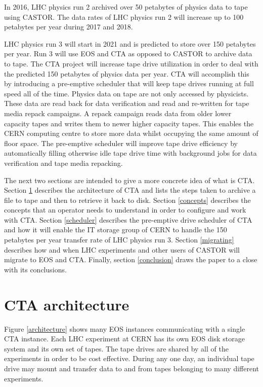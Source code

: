 \documentclass[a4paper]{jpconf}
\begin{document}
In 2016, LHC physics run 2 archived over 50 petabytes of physics data to tape
using CASTOR.  The data rates of LHC physics run 2 will increase up to 100
petabytes per year during 2017 and 2018.

LHC physics run 3 will start in 2021 and is predicted to store over 150
petabytes per year.  Run 3 will use EOS and CTA as opposed to CASTOR to archive
data to tape.  The CTA project will increase tape drive utilization in order to
deal with the predicted 150 petabytes of physics data per year.  CTA
will accomplish this by introducing a pre-emptive scheduler that will keep
tape drives running at full speed \cite{new} all of the time.  Physics data on
tape are not only accessed by physicists.  These data are read back for data
verification and read and re-written for tape media repack\cite{repack}
campaigns. A repack campaign reads data from older lower capacity tapes and
writes them to newer higher capacity tapes.  This enables the CERN computing
centre to store more data whilst occupying the same amount of floor space. The
pre-emptive scheduler will improve tape drive efficiency by automatically
filling otherwise idle tape drive time with background jobs for data
verification and tape media repacking.

The next two sections are intended to give a more concrete idea of what is CTA.
Section \ref{cta_architecture} describes the architecture of CTA and lists the
steps taken to archive a file to tape and then to retrieve it back to disk.
Section \ref{concepts} describes the concepts that an operator needs to
understand in order to configure and work with CTA.  Section \ref{scheduler}
describes the pre-emptive drive scheduler of CTA and how it will enable the IT
storage group of CERN to handle the 150 petabytes per year transfer rate of LHC
physics run 3.  Section \ref{migrating} describes how and when LHC experiments
and other users of CASTOR will migrate to EOS and CTA.  Finally, section
\ref{conclusion} draws the paper to a close with its conclusions.

\section{CTA architecture} \label{cta_architecture}

Figure \ref{architecture} shows many EOS instances communicating with a single
CTA instance.  Each LHC experiment at CERN has its own EOS disk storage system
and its own set of tapes.  The tape drives are shared by all of the experiments
in order to be cost effective.  During any one day, an individual tape drive
may mount and transfer data to and from tapes belonging to many different
experiments.
\end{document}

